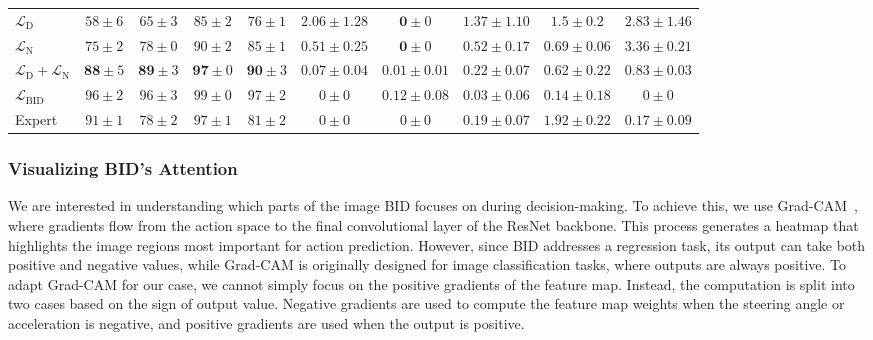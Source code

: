 \begin{table}
\begin{tabular}{lccccccccc}
		$\mathcal{L}_\text{D}$
		& $58\pm6$ & $65\pm3$ & $85\pm2$ & $76\pm1$ 
		& $2.06\pm1.28$ & $\mathbf{0}\pm0$ & $1.37\pm1.10$ & $1.5\pm0.2$ & $2.83\pm1.46$ \\
		$\mathcal{L}_\text{N}$
		& $75\pm2$ & $78\pm0$ & $90\pm2$ & $85\pm1$ 
		& $0.51\pm0.25$ & $\mathbf{0}\pm0$ & $0.52\pm0.17$ & $0.69\pm0.06$ & $3.36\pm0.21$ \\
		$\mathcal{L}_\text{D}+\mathcal{L}_\text{N}$
		& $\mathbf{88} \pm 5$ & $\mathbf{89} \pm 3$ & $\mathbf{97} \pm 0$ & $\mathbf{90} \pm 3$ 
		& $\mathbf{0.07} \pm 0.04$ & $0.01 \pm 0.01$ & $\mathbf{0.22} \pm 0.07$ & $\mathbf{0.62} \pm 0.22$ & $\mathbf{0.83} \pm 0.03$ \\
		\hline
		$\mathcal{L}_\text{BID}$
		& $96 \pm 2$ & $96 \pm 3$ & $99 \pm 0$ & $97 \pm 2$ 
		& $0 \pm 0$ & $0.12 \pm 0.08$ & $0.03 \pm 0.06$ & $0.14 \pm 0.18$ & $0 \pm 0$ \\
		Expert
		& $91 \pm 1$ & $78 \pm 2$ & $97 \pm 1$ & $81 \pm 2$ 
		& $0 \pm 0$ & $0 \pm 0$ & $0.19 \pm 0.07$ & $1.92 \pm 0.22$ & $0.17 \pm 0.09$\\
		\hline
	\end{tabular}
	\vspace{-1ex}
	\vspace{-2.5ex}
	\label{table:infraction}
\end{table}


\subsubsection{Visualizing BID's Attention}
\label{sec:Visualization}
\hspace{1pc}We are interested in understanding which parts of the image BID focuses on during decision-making. 
To achieve this, we use Grad-CAM~\cite{Selvaraju:2017}, where gradients flow from the action space to the final convolutional layer of the ResNet backbone. 
This process generates a heatmap that highlights the image regions most important for action prediction. 
However, since BID addresses a regression task, its output can take both positive and negative values, while Grad-CAM is originally designed for image classification tasks, where outputs are always positive. 
To adapt Grad-CAM for our case, we cannot simply focus on the positive gradients of the feature map. 
Instead, the computation is split into two cases based on the sign of output value. 
Negative gradients are used to compute the feature map weights when the steering angle or acceleration is negative, and positive gradients are used when the output is positive.



